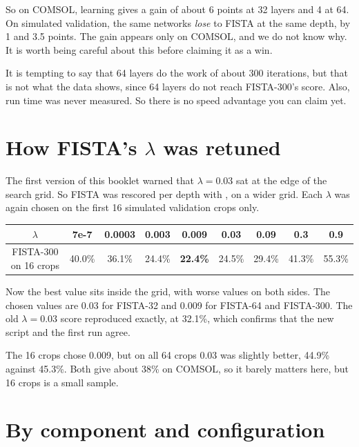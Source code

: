 So on COMSOL, learning gives a gain of about 6 points at 32 layers and 4 at 64. On simulated validation, the same
networks \emph{lose} to FISTA at the same depth, by 1 and 3.5 points. The gain appears only on COMSOL, and we do not
know why. It is worth being careful about this before claiming it as a win.

\begin{careful}
It is tempting to say that 64 layers do the work of about 300 iterations, but that is not what the data shows, since
64 layers do not reach FISTA-300's score. Also, run time was never measured. So there is no speed advantage you can claim
yet.
\end{careful}

\section{How FISTA's $\lambda$ was retuned}

The first version of this booklet warned that $\lambda=0.03$ sat at the edge of the search grid. So FISTA was rescored per
depth with , on a wider grid. Each $\lambda$ was again chosen on the first 16
simulated validation crops only.

\begin{center}
\begin{tabular}{ccccccccc}
\toprule
$\lambda$ & 7e-7 & 0.0003 & 0.003 & 0.009 & 0.03 & 0.09 & 0.3 & 0.9 \\
\midrule
FISTA-300 on 16 crops & 40.0\% & 36.1\% & 24.4\% & \textbf{22.4\%} & 24.5\% & 29.4\% & 41.3\% & 55.3\% \\
\bottomrule
\end{tabular}
\end{center}

Now the best value sits inside the grid, with worse values on both sides. The chosen values are 0.03 for FISTA-32 and
0.009 for FISTA-64 and FISTA-300. The old $\lambda=0.03$ score reproduced exactly, at 32.1\%, which confirms that the new
script and the first run agree.

\begin{careful}
The 16 crops chose 0.009, but on all 64 crops 0.03 was slightly better, 44.9\% against 45.3\%. Both give about 38\% on
COMSOL, so it barely matters here, but 16 crops is a small sample.
\end{careful}

\section{By component and configuration}

